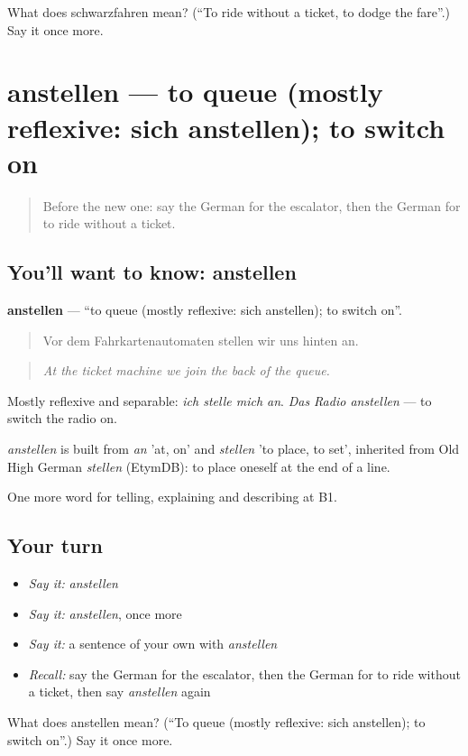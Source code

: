 \begin{tcolorbox}[breakable,colback=teal!4,colframe=teal!35!black,title={Before you move on}]
What does schwarzfahren mean? (\textquotedblleft{}To ride without a ticket, to dodge the fare\textquotedblright{}.) Say it once more.
\end{tcolorbox}
\section[anstellen]{anstellen — to queue (mostly reflexive: sich anstellen); to switch on}

\label{lesson:GE-C415-anstellen}



\begin{quote}
Before the new one: say the German for the escalator, then the German for to ride without a ticket.
\end{quote}

\subsection*{You'll want to know: anstellen}
\textbf{anstellen} — \textquotedblleft{}to queue (mostly reflexive: sich anstellen); to switch on\textquotedblright{}.

\begin{quote}
Vor dem Fahrkartenautomaten stellen wir uns hinten an.
\end{quote}

\begin{quote}
\emph{At the ticket machine we join the back of the queue.}
\end{quote}

Mostly reflexive and separable: \emph{ich stelle mich an}. \emph{Das Radio anstellen} — to switch the radio on.

\begin{cousinweb}
\emph{anstellen} is built from \emph{an} 'at, on' and \emph{stellen} 'to place, to set', inherited from Old High German \emph{stellen} (EtymDB): to place oneself at the end of a line.
\end{cousinweb}

\begin{grammarlens}[title={What you've built}]
One more word for telling, explaining and describing at B1.
\end{grammarlens}

\subsection*{Your turn}
\begin{itemize}
\raggedright
  \item \emph{Say it:} \emph{anstellen}
  \item \emph{Say it:} \emph{anstellen}, once more
  \item \emph{Say it:} a sentence of your own with \emph{anstellen}
  \item \emph{Recall:} say the German for the escalator, then the German for to ride without a ticket, then say \emph{anstellen} again
\end{itemize}

\begin{tcolorbox}[breakable,colback=teal!4,colframe=teal!35!black,title={Before you move on}]
What does anstellen mean? (\textquotedblleft{}To queue (mostly reflexive: sich anstellen); to switch on\textquotedblright{}.) Say it once more.
\end{tcolorbox}
